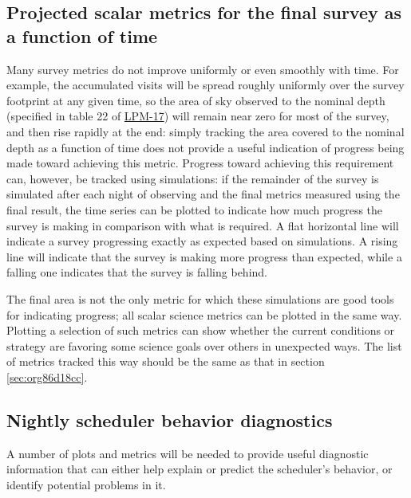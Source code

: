 \subsection{Projected scalar metrics for the final survey as a function of time}
\label{sec:orgf2a86ae}
Many survey metrics do not improve uniformly or even smoothly with time.
For example, the accumulated visits will be spread roughly uniformly over the survey footprint at any given time, so the area of sky observed to the nominal depth (specified in table 22 of \href{http://ls.st/lpm-17}{LPM-17}) will remain near zero for most of the survey, and then rise rapidly at the end: simply tracking the area covered to the nominal depth as a function of time does not provide a useful indication of progress being made toward achieving this metric.
Progress toward achieving this requirement can, however, be tracked using simulations: if the remainder of the survey is simulated after each night of observing and the final metrics measured using the final result, the time series can be plotted to indicate how much progress the survey is making in comparison with what is required.
A flat horizontal line will indicate a survey progressing exactly as expected based on simulations.
A rising line will indicate that the survey is making more progress than expected, while a falling one indicates that the survey is falling behind.

The final area is not the only metric for which these simulations are good tools for indicating progress; all scalar science metrics can be plotted in the same way. Plotting a selection of such metrics can show whether the current conditions or strategy are favoring some science goals over others in unexpected ways.
The list of metrics tracked this way should be the same as that in section \ref{sec:org86d18cc}.

\subsection{Nightly scheduler behavior diagnostics}
\label{sec:org848dea4}
A number of plots and metrics will be needed to provide useful diagnostic information that can either help explain or predict the scheduler's behavior, or identify potential problems in it.

